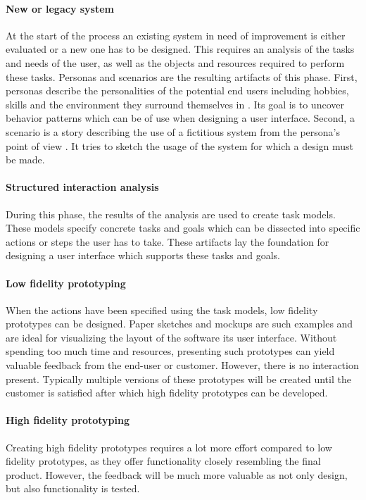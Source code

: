         \paragraph{New or legacy system} At the start of the process an existing system in need of improvement is either evaluated or a new one has to be designed. This requires an analysis of the tasks and needs of the user, as well as the objects and resources required to perform these tasks. Personas and scenarios are the resulting artifacts of this phase. First, personas describe the personalities of the potential end users including hobbies, skills and the environment they surround themselves in \cite{persona_scenario}. Its goal is to uncover behavior patterns which can be of use when designing a user interface. Second, a scenario is a story describing the use of a fictitious system from the persona's point of view \cite{persona_scenario}. It tries to sketch the usage of the system for which a design must be made.

        \paragraph{Structured interaction analysis} During this phase, the results of the analysis are used to create task models. These models specify concrete tasks and goals which can be dissected into specific actions or steps the user has to take. These artifacts lay the foundation for designing a user interface which supports these tasks and goals.

        \paragraph{Low fidelity prototyping} When the actions have been specified using the task models, low fidelity prototypes can be designed. Paper sketches and mockups are such examples and are ideal for visualizing the layout of the software its user interface. Without spending too much time and resources, presenting such prototypes can yield valuable feedback from the end-user or customer. However, there is no interaction present. Typically multiple versions of these prototypes will be created until the customer is satisfied after which high fidelity prototypes can be developed.

        \paragraph{High fidelity prototyping} Creating high fidelity prototypes requires a lot more effort compared to low fidelity prototypes, as they offer functionality closely resembling the final product. However, the feedback will be much more valuable as not only design, but also functionality is tested.

